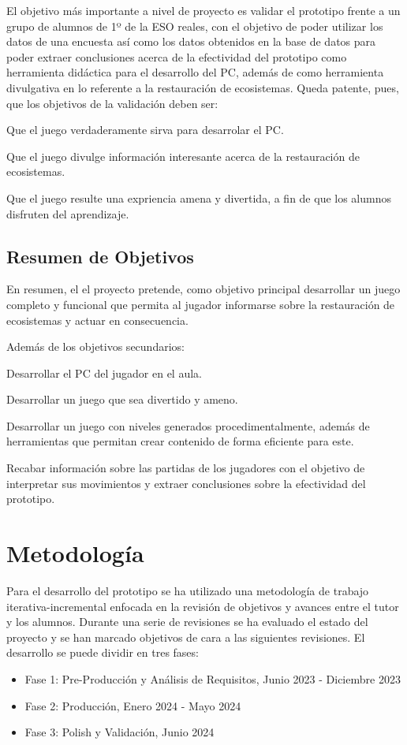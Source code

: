 El objetivo más importante a nivel de proyecto es validar el prototipo frente a un grupo de alumnos de 1º de la ESO reales, con el objetivo de poder utilizar los datos de una encuesta así como los datos obtenidos en la base de datos para poder extraer conclusiones acerca de la efectividad del prototipo como herramienta didáctica para el desarrollo del PC, además de como herramienta divulgativa en lo referente a la restauración de ecosistemas.
Queda patente, pues, que los objetivos de la validación deben ser:
\begin{compactitem}
    \item Que el juego verdaderamente sirva para desarrolar el PC.
    \item Que el juego divulge información interesante acerca de la restauración de ecosistemas.
    \item Que el juego resulte una expriencia amena y divertida, a fin de que los alumnos disfruten del aprendizaje.
\end{compactitem} 

\subsection{Resumen de Objetivos}

En resumen, el el proyecto pretende, como objetivo principal desarrollar un juego completo y funcional que permita al jugador informarse sobre la restauración de ecosistemas y actuar en consecuencia.

Además de los objetivos secundarios:
\begin{compactitem}
  \item Desarrollar el PC del jugador en el aula.
  \item Desarrollar un juego que sea divertido y ameno.
  \item Desarrollar un juego con niveles generados procedimentalmente, además de herramientas que permitan crear contenido de forma eficiente para este.
  \item Recabar información sobre las partidas de los jugadores con el objetivo de interpretar sus movimientos y extraer conclusiones sobre la efectividad del prototipo.
\end{compactitem}

\section{Metodología}

Para el desarrollo del prototipo se ha utilizado una metodología de trabajo iterativa-incremental enfocada en la revisión de objetivos y
avances entre el tutor y los alumnos. Durante una serie de revisiones se ha evaluado el estado del proyecto y se han marcado objetivos de cara a las siguientes revisiones. El desarrollo se puede dividir en tres fases: 
\begin{itemize}
	\item Fase 1: Pre-Producción y Análisis de Requisitos, Junio 2023 - Diciembre 2023
	\item Fase 2: Producción, Enero 2024 - Mayo 2024
	\item Fase 3: Polish y Validación, Junio 2024 
\end{itemize}

